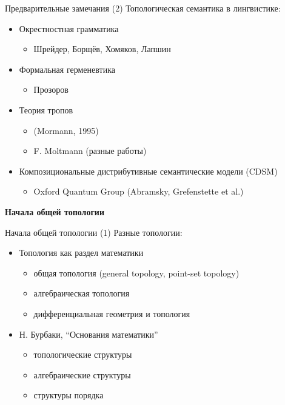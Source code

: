 \documentclass{beamer}
\begin{document}
\begin{frame}{Предварительные замечания (2)}
Топологическая семантика в лингвистике:\\
\bigskip
\begin{itemize}
    \item Окрестностная грамматика
		\begin{itemize}
			\item Шрейдер, Борщёв, Хомяков, Лапшин
		\end{itemize}
    \item Формальная герменевтика
		\begin{itemize}
			\item Прозоров
		\end{itemize}
    \item Теория тропов
		\begin{itemize}
			\item (Mormann, 1995)
			\item F. Moltmann (разные работы)
		\end{itemize}
    \item Композициональные дистрибутивные семантические модели (CDSM)
		\begin{itemize}
			\item Oxford Quantum Group (Abramsky, Grefenstette et al.)
		\end{itemize}
\end{itemize}
\end{frame}


\begin{frame}{}
\begin{center}
	\textbf{Начала общей топологии}
\end{center}
\end{frame}

\begin{frame}{Начала общей топологии (1)}
Разные топологии:\\
\bigskip
\begin{itemize}
	\item Топология как раздел математики
		\begin{itemize}
			\item общая топология (general topology, point-set topology)
			\item алгебраическая топология
			\item дифференциальная геометрия и топология
		\end{itemize}
	\bigskip
	\item Н. Бурбаки, ``Основания математики''
		\begin{itemize}
			\item топологические структуры
			\item алгебраические структуры
			\item структуры порядка
		\end{itemize}
\end{itemize}
\end{frame}
\end{document}
